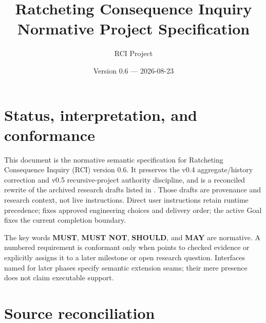 \documentclass[11pt]{article}
\title{Ratcheting Consequence Inquiry\\
Normative Project Specification}
\author{RCI Project}
\date{Version 0.6 --- 2026-08-23}
\begin{document}
\maketitle

\section*{Status, interpretation, and conformance}

This document is the normative semantic specification for Ratcheting Consequence
Inquiry (RCI) version 0.6. It preserves the v0.4 aggregate/history correction and v0.5
recursive-project authority discipline, and is a
reconciled rewrite of the archived research
drafts listed in . Those drafts are provenance and
research context, not live instructions. Direct user instructions retain runtime
precedence;  fixes approved engineering choices and delivery order;
the active Goal fixes the current completion boundary.

The key words \textbf{MUST}, \textbf{MUST NOT}, \textbf{SHOULD}, and
\textbf{MAY} are normative. A numbered requirement is conformant only when
 points to checked evidence or explicitly
assigns it to a later milestone or open research question. Interfaces named for
later phases specify semantic extension seams; their mere presence does not
claim executable support.

\section{Source reconciliation}
\end{document}
